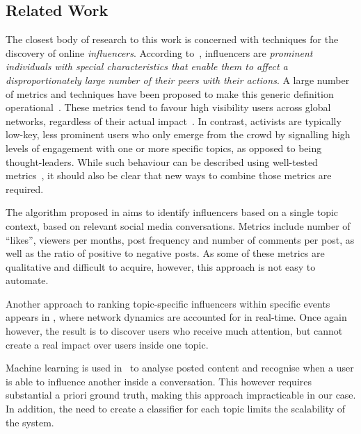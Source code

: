 \subsection{Related Work}  \label{sec:related}

The closest body of research to this work is concerned with techniques for the discovery of online \textit{influencers}. 
According to~\cite{Kardara2015}, influencers are \textit{prominent individuals with special characteristics that enable them to	affect a disproportionately large number of their peers with their actions}.
%
A large number of metrics and techniques have been proposed to make this generic definition operational~\cite{RIQUELME2016949}. 
%
These metrics tend to favour high visibility users across global networks, regardless of their actual impact~\cite{Cha2010MeasuringUI}. 
%
In contrast, activists are typically low-key, less prominent users who only emerge from the crowd by signalling high levels of engagement with one or more specific topics, as opposed to being thought-leaders. 
%
While such behaviour can be described  using well-tested metrics~\cite{RIQUELME2016949}, it should also be clear that new ways to combine those metrics are required.

The algorithm proposed in \cite{MATIC2011} aims to identify influencers based on a single topic context, based on relevant social media conversations.
Metrics include number of ``likes'', viewers per months, post frequency and  number of comments per post, as well as the ratio of positive to negative posts.
As some of these metrics are qualitative and difficult to acquire, however, this approach is not easy to automate.

Another approach to ranking topic-specific influencers within specific events appears in  \cite{Kardara2015}, where network dynamics are accounted for in real-time.
Once again however, the result is to discover users who receive much attention, but cannot create a real impact over users inside one topic.

Machine learning is used in~\cite{Biran2012} to analyse posted content and recognise when a user is able to influence another  inside a conversation.
This however requires substantial a priori ground truth, making this approach impracticable in our case. In addition, the need to create a classifier for each topic limits the scalability of the system.

